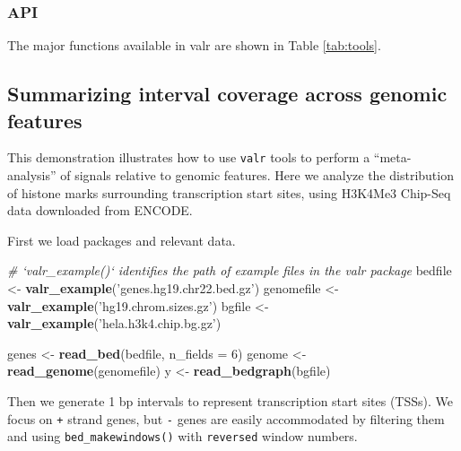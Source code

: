 \documentclass[9pt,a4paper]{extarticle}
\renewcommand{\KeywordTok}[1]{\textbf{{#1}}}
\renewcommand{\DataTypeTok}[1]{\textcolor[rgb]{0.50,0.00,0.00}{{#1}}}
\renewcommand{\DecValTok}[1]{\textcolor[rgb]{0.00,0.00,1.00}{{#1}}}
\renewcommand{\StringTok}[1]{\textcolor[rgb]{0.87,0.00,0.00}{{#1}}}
\renewcommand{\CommentTok}[1]{\textcolor[rgb]{0.50,0.50,0.50}{\textit{{#1}}}}
\renewcommand{\NormalTok}[1]{{#1}}
\begin{document}
\subsubsection*{API}\label{api}
The major functions available in valr are shown in Table \ref{tab:tools}.


\subsection*{Summarizing interval coverage across genomic features}

This demonstration illustrates how to use \texttt{valr} tools to perform
a ``meta-analysis'' of signals relative to genomic features. Here we
analyze the distribution of histone marks surrounding transcription
start sites, using H3K4Me3 Chip-Seq data downloaded from ENCODE.

First we load packages and relevant data.

\begin{Highlighting}[]
\CommentTok{# `valr_example()` identifies the path of example files in the valr package}
\NormalTok{bedfile <-}\StringTok{ }\KeywordTok{valr_example}\NormalTok{(}\StringTok{'genes.hg19.chr22.bed.gz'}\NormalTok{)}
\NormalTok{genomefile <-}\StringTok{ }\KeywordTok{valr_example}\NormalTok{(}\StringTok{'hg19.chrom.sizes.gz'}\NormalTok{)}
\NormalTok{bgfile  <-}\StringTok{ }\KeywordTok{valr_example}\NormalTok{(}\StringTok{'hela.h3k4.chip.bg.gz'}\NormalTok{)}

\NormalTok{genes <-}\StringTok{ }\KeywordTok{read_bed}\NormalTok{(bedfile, }\DataTypeTok{n_fields =} \DecValTok{6}\NormalTok{)}
\NormalTok{genome <-}\StringTok{ }\KeywordTok{read_genome}\NormalTok{(genomefile)}
\NormalTok{y <-}\StringTok{ }\KeywordTok{read_bedgraph}\NormalTok{(bgfile)}
\end{Highlighting}

Then we generate 1 bp intervals to represent transcription start sites
(TSSs). We focus on \texttt{+} strand genes, but \texttt{-} genes are
easily accommodated by filtering them and using
\texttt{bed\_makewindows()} with \texttt{reversed} window numbers.
\end{document}
